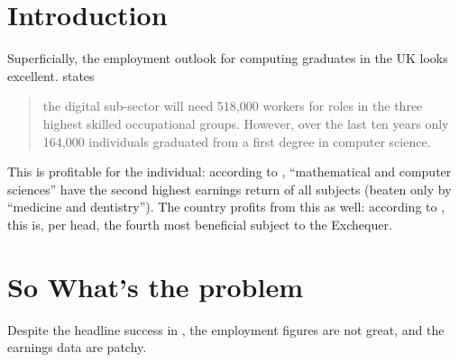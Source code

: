 \documentclass[sigconf]{acmart}
\begin{document}

\section{Introduction}
Superficially, the employment outlook for computing graduates in the UK looks excellent. \cite[p.~74]{UKCES2015b} states
\begin{quote}
the digital sub-sector will need 518,000 workers for roles in the three highest skilled occupational groups. However, over the last ten years only 164,000 individuals graduated from a first degree in computer science.
\end{quote}
This is profitable for the individual: according to \cite[Figure 4]{BIS2011a}, ``mathematical and computer sciences'' have the second highest earnings return of all subjects (beaten only by ``medicine and dentistry'').
The country profits from this as well: according to
\cite[p.~16]{BIS2011a}, this is, per head, the fourth most beneficial
subject to the Exchequer.


\section{So What's the problem}
Despite the headline success in \cite{BIS2011a}, the employment
figures are not great, and the earnings data are patchy.
\end{document}
